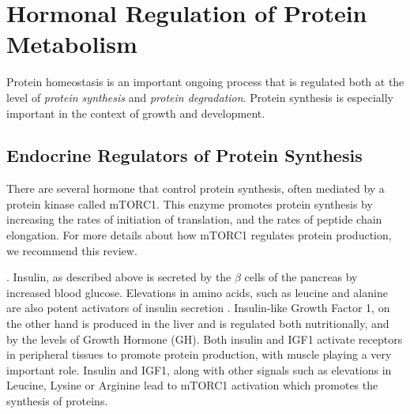 \documentclass{tufte-handout}
\begin{document}
\section{Hormonal Regulation of Protein Metabolism}
Protein homeostasis is an important ongoing process that is regulated both at the level of \emph{protein synthesis} and \emph{protein degradation}.  Protein synthesis is especially important in the context of growth and development.  

\subsection{Endocrine Regulators of Protein Synthesis}

There are several hormone that control protein synthesis, often mediated by a protein kinase called mTORC1.   This enzyme promotes protein synthesis by increasing the rates of initiation of translation, and the rates of peptide chain elongation.  For more details about how mTORC1 regulates protein production, we recommend this review\cite{Gingras2004}.

.  Insulin, as described above is secreted by the $\beta$ cells of the pancreas by increased blood glucose.  Elevations in amino acids, such as leucine and alanine are also potent activators of insulin secretion \citep{Floyd1966}.  Insulin-like Growth Factor 1, on the other hand is produced in the liver and is regulated both nutritionally, and by the levels of Growth Hormone (GH).  Both insulin and IGF1 activate receptors in peripheral tissues to promote protein production, with muscle playing a very important role.   Insulin and IGF1, along with other signals such as elevations in Leucine, Lysine or Arginine lead to mTORC1 activation which promotes the synthesis of proteins.
\end{document}
